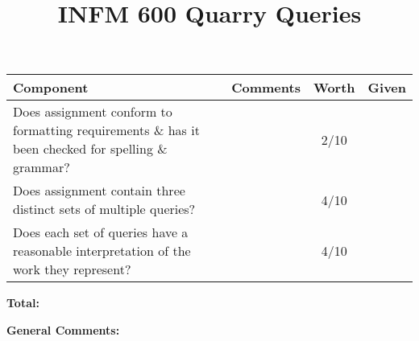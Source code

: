 \documentclass[12pt]{article}
\title{INFM 600 Quarry Queries}
\date{\vspace{-10ex}}%
\newcommand\tab[1][0.25cm]{\hspace*{#1}}
\begin{document}
	\maketitle
		\renewcommand{\arraystretch}{2}
		\begin{tabulary}{6.5in}{| p{2.75in} | p{2.5in} | c | c |}
			\hline
			\textbf{Component} & \textbf{Comments} & \textbf{Worth} & \textbf{Given}\\
			\hline
			Does assignment conform to formatting requirements \& has it been checked for spelling \& grammar?  & &  2/10 & \\
			\hline
			Does assignment contain three distinct sets of multiple queries? & &  4/10 & \\
			\hline
			Does each set of queries have a reasonable interpretation of the work they represent? & &  4/10 & \\
			\hline
		\end{tabulary}

\begin{flushright}
	\textbf{Total:}\tab[3.3cm]
\end{flushright}


	\textbf{General Comments:}

	
\end{document}
